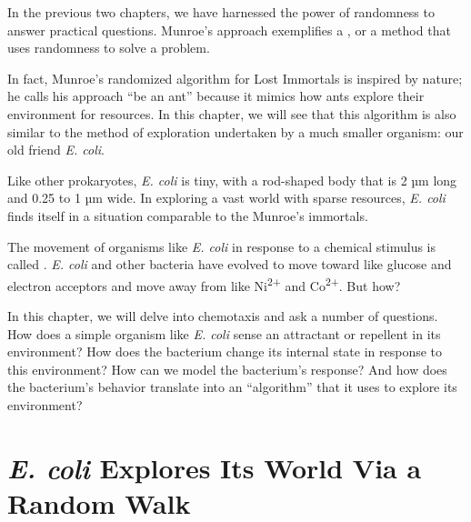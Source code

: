 In the previous two chapters, we have harnessed the power of randomness to answer practical questions. Munroe's approach exemplifies a , or a method that uses randomness to solve a problem.

In fact, Munroe's randomized algorithm for Lost Immortals is inspired by nature; he calls his approach ``be an ant'' because it mimics how ants explore their environment for resources. In this chapter, we will see that this algorithm is also similar to the method of exploration undertaken by a much smaller organism: our old friend \textit{E. coli}.

Like other prokaryotes, \textit{E. coli} is tiny, with a rod-shaped body that is 2 µm long and 0.25 to 1 µm wide. In exploring a vast world with sparse resources, \textit{E. coli} finds itself in a situation comparable to the Munroe's immortals.

%

The movement of organisms like \textit{E. coli} in response to a chemical stimulus is called . \textit{E. coli} and other bacteria have evolved to move toward  like glucose and electron acceptors and move away from  like Ni\textsuperscript{2+} and Co\textsuperscript{2+}. But how?

In this chapter, we will delve into chemotaxis and ask a number of questions. How does a simple organism like \textit{E. coli} sense an attractant or repellent in its environment? How does the bacterium change its internal state in response to this environment? How can we model the bacterium's response? And how does the bacterium's behavior translate into an ``algorithm'' that it uses to explore its environment?\\

\FloatBarrier
{}
\section{\textit{E. coli} Explores Its World Via a Random Walk}
\label{sec:e_coli_explores_its_world_via_a_random_walk}

